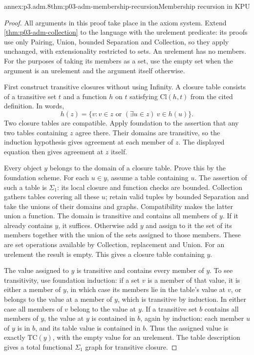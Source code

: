 \begin{annexitem}{annex:p3.adm.8}{thm:p03-adm-membership-recursion}{Membership recursion in KPU}
\begin{proof}
All arguments in this proof take place in the axiom system. Extend
\cref{thm:p03-adm-collection} to the language with the urelement predicate:
its proofs use only Pairing, Union, bounded Separation and Collection,
so they apply unchanged, with extensionality restricted to sets. An
urelement has no members. For the purposes of taking its members as a
set, use the empty set when the argument is an urelement and the
argument itself otherwise.

First construct transitive closures without using Infinity. A closure
table consists of a transitive set \(t\) and a function \(h\) on \(t\)
satisfying \(\mathrm{Cl}(h,t)\) from the cited definition. In words,
\[
 h(z)=\{v:v\in z\text{ or }(\exists u\in z)\ v\in h(u)\}.
\]
Two closure tables are compatible. Apply foundation to the assertion
that any two tables containing \(z\) agree there. Their domains are
transitive, so the induction hypothesis gives agreement at each member
of \(z\). The displayed equation then gives agreement at \(z\) itself.

Every object \(y\) belongs to the domain of a closure table. Prove this
by the foundation scheme. For each \(u\in y\), assume a table containing
\(u\). The assertion of such a table is \(\Sigma_1\): its local closure
and function checks are bounded. Collection gathers tables covering all
these \(u\); retain valid tuples by bounded Separation and take the
unions of their domains and graphs. Compatibility makes the latter
union a function. The domain is transitive and contains all members of
\(y\). If it already contains \(y\), it suffices. Otherwise add \(y\)
and assign to it the set of its members together with the union of the
sets assigned to those members. These are set operations available by
Collection, replacement and Union. For an urelement the result is empty.
This gives a closure table containing \(y\).

The value assigned to \(y\) is transitive and contains every member of
\(y\). To see transitivity, use foundation induction: if a set \(v\)
is a member of that value, it is either a member of \(y\), in which
case its members lie in the table's value at \(v\), or belongs to the
value at a member of \(y\), which is transitive by induction. In either
case all members of \(v\) belong to the value at \(y\). If a transitive
set \(b\) contains all members of \(y\), the value at \(y\) is contained
in \(b\), again by induction: each member \(u\) of \(y\) is in \(b\),
and its table value is contained in \(b\). Thus the assigned value is
exactly \(\mathrm{TC}(y)\), with the empty value for an urelement.
The table description gives a total functional \(\Sigma_1\) graph for
transitive closure.


\end{proof}
\end{annexitem}
